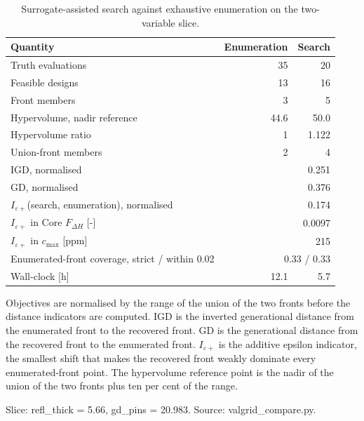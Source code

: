 \begin{table}[htbp]
  \centering
  \begin{threeparttable}
  \caption[Search against exhaustive enumeration]{Surrogate-assisted search against exhaustive enumeration on the two-variable slice.}
  \label{tab:valgrid}
  \begin{tabular}{lrr}
    \toprule
    Quantity & Enumeration & Search \\
    \midrule
    Truth evaluations & 35 & 20 \\
    Feasible designs & 13 & 16 \\
    Front members & 3 & 5 \\
    Hypervolume, nadir reference & 44.6 & 50.0 \\
    Hypervolume ratio & 1 & 1.122 \\
    Union-front members & 2 & 4 \\
    \midrule
    IGD, normalised & \multicolumn{2}{r}{0.251} \\
    GD, normalised & \multicolumn{2}{r}{0.376} \\
    $I_{\varepsilon+}$(search, enumeration), normalised & \multicolumn{2}{r}{0.174} \\
    $I_{\varepsilon+}$ in Core $F_{\Delta H}$ [-] & \multicolumn{2}{r}{0.0097} \\
    $I_{\varepsilon+}$ in $c_\mathrm{max}$ [ppm] & \multicolumn{2}{r}{215} \\
    Enumerated-front coverage, strict / within 0.02 & \multicolumn{2}{r}{0.33 / 0.33} \\
    Wall-clock [h] & 12.1 & 5.7 \\
    \bottomrule
  \end{tabular}
  \begin{tablenotes}\footnotesize
    \item Objectives are normalised by the range of the union of the two fronts before the distance indicators are computed. IGD is the inverted generational distance from the enumerated front to the recovered front. GD is the generational distance from the recovered front to the enumerated front. $I_{\varepsilon+}$ is the additive epsilon indicator, the smallest shift that makes the recovered front weakly dominate every enumerated-front point. The hypervolume reference point is the nadir of the union of the two fronts plus ten per cent of the range.
    \item Slice: refl_thick = 5.66, gd_pins = 20.983. Source: valgrid\_compare.py.
  \end{tablenotes}
  \end{threeparttable}
\end{table}
